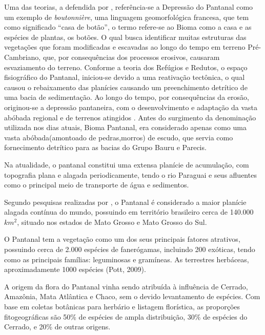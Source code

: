 Uma das teorias, a defendida por , referência-se a Depressão  do Pantanal como um exemplo de \textit{boutonnière}, uma linguagem geomorfológica francesa, que tem como significado “casa de botão”, o termo refere-se ao Bioma como a casa e as espécies de plantas, os botões. O qual busca identificar muitas estruturas das vegetações que foram modificadas e escavadas ao longo do tempo em terreno Pré-Cambriano, que, por consequências dos processos erosivos, causaram esvaziamento do terreno. Conforme a teoria dos Refúgios e Redutos, o espaço fisiográfico do Pantanal, iniciou-se devido a uma reativação tectônica, o qual causou o rebaixamento das planícies causando um preenchimento detrítico de uma bacia de sedimentação. Ao longo do tempo, por consequências da erosão, originou-se a depressão pantaneira, com o desenvolvimento e adaptação da vasta abóbada regional e de terrenos atingidos \cite{ab2006brasil}. Antes do surgimento da denominação utilizada nos dias atuais, Bioma Pantanal, era considerado apenas como uma vasta abóbada(amontoado de pedras,morros) de escudo, que servia como fornecimento detrítico para as bacias do Grupo Bauru e Parecis.

Na atualidade, o pantanal constitui uma extensa planície de acumulação, com topografia plana e alagada periodicamente, tendo o rio Paraguai e seus afluentes como o principal meio de transporte de água e sedimentos. \cite{souza2006origem}

Segundo pesquisas realizadas por , o Pantanal é considerado a maior planície alagada contínua do mundo, possuindo em território brasileiro cerca de 140.000 $km^{2}$,  situado nos estados de Mato Grosso e Mato Grosso do Sul.

O Pantanal tem a vegetação como um dos seus principais fatores atrativos, possuindo cerca de 2.000 espécies de fanerógamas, incluindo 200 exóticas, tendo como as principais famílias: leguminosas e gramíneas. As terrestres herbáceas, aproximadamente 1000 espécies (Pott, 2009).

\begin{citacao}
	A origem da flora do Pantanal vinha sendo atribuída à influência de Cerrado, Amazônia, Mata Atlântica e Chaco, sem o devido levantamento de espécies. Com base em coletas botânicas para herbário e listagem florística, as proporções fitogeográficas são 50\% de espécies de ampla distribuição, 30\% de espécies do Cerrado, e 20\% de outras origens. \cite{pott2009vegetaccao}
\end{citacao}

